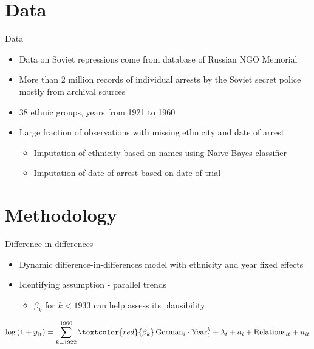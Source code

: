 \documentclass[11pt]{beamer}
\begin{document}
\section{Data}
\begin{frame}[label=data]{Data}
\begin{itemize}
    \item Data on Soviet repressions come from database of Russian NGO  Memorial
    \item More than 2 million records of individual arrests by the Soviet secret police mostly from archival sources
    \item 38 ethnic groups, years from 1921 to 1960
    \item Large fraction of observations with missing ethnicity and date of arrest 
    \begin{itemize}
        \item Imputation of ethnicity based on names using Naive Bayes  classifier  \hyperlink{ethnicity_imputation}{}
        \item Imputation of date of arrest based on date of trial \hyperlink{arrest_date_imputation}{}
    \end{itemize}
    
\end{itemize}
\end{frame}

\section{Methodology}
\begin{frame}{Difference-in-differences}
\begin{itemize}
    \item Dynamic difference-in-differences model with ethnicity and year fixed effects
    \item Identifying assumption - parallel trends 
    \begin{itemize}
        \item $\beta_k$ for $k < 1933$ can help assess its plausibility
    \end{itemize}
\end{itemize}

\begin{equation*}
 \log\left(1 + y_{it}\right) = \sum_{k= 1922}^{1960} 
 \textcolor{red}{\beta_k} \, \text{German}_{i} \cdot \text{Year}_{t}^k
 +  \lambda_t + a_i +  \text{Relations}_{it}   + u_{it}
 \label{eq:dynamic_did}
\end{equation*}
\end{frame}
\end{document}
